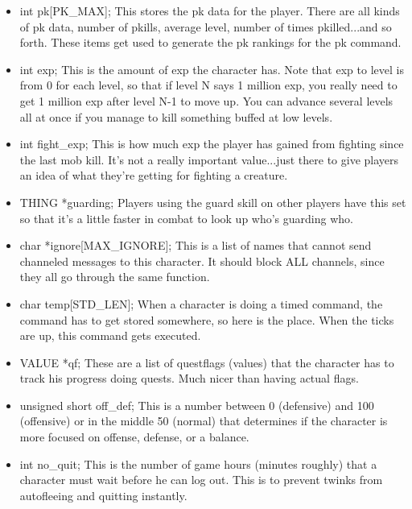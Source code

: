 \begin{itemize}
 \item int pk[PK\_MAX]; This stores the pk data for the player. There
 are all kinds of pk data, number of pkills, average level, number of
 times pkilled...and so forth. These items get used to generate the pk
 rankings for the pk command.

 \item int exp;              This is the amount of exp the character
 has. Note that exp to level is from 0 for each level, so that if
 level N says 1 million exp, you really need to get 1 million exp
 after level N-1 to move up. You can advance several levels all at
 once if you manage to kill something buffed at low levels.
        

 \item int fight\_exp;                This is how much exp the player
 has gained from fighting since the last mob kill. It's not a really
 important value...just there to give players an idea of what they're
 getting for fighting a creature.


\item  THING *guarding;              Players using the guard skill on
 other players have this set so that it's a little faster in combat to
 look up who's guarding who.

\item  char *ignore[MAX\_IGNORE];      This is a list of names that
 cannot send channeled messages to this character. It should block ALL
 channels, since they all go through the same function.
 
\item  char temp[STD\_LEN];          When a character is doing a timed
 command, the command has to get stored somewhere, so here is the
 place. When the ticks are up, this command gets executed.


\item  VALUE *qf;           These are a list of questflags (values) that
  the character has to track his progress doing quests. Much nicer
  than having actual flags.

\item  unsigned short off\_def;       This is a number between 0
  (defensive) and 100 (offensive) or in the middle 50 (normal) that
  determines if the character is more focused on offense, defense, or
  a balance.

 \item int no\_quit;                  This is the number of game hours
 (minutes roughly) that a character must wait before he can log
 out. This is to prevent twinks from autofleeing and quitting instantly.


\end{itemize}
